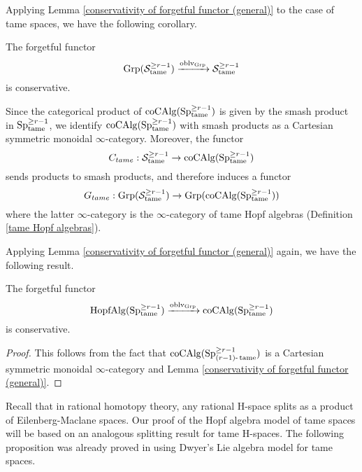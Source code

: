 Applying Lemma \ref{conservativity of forgetful functor (general)} to the case of tame spaces, we have the following corollary.

\begin{corollary}
\label{conservativity of forgetful functor}
	The forgetful functor 
	\[
	\operatorname{Grp}({\mathcal{S}}^{\geq r-1}_{\operatorname{\operatorname{tame}}}) \xrightarrow{\operatorname{oblv}_{\operatorname{Grp}}} 
	{\mathcal{S}}^{\geq r-1}_{\operatorname{\operatorname{tame}}}
	\]
	is conservative.
\end{corollary}

Since the categorical product of $\operatorname{coCAlg}(\operatorname{Sp}^{\geq r-1}_{\operatorname{\operatorname{tame}}})$ is given by the smash product in $\operatorname{Sp}^{\geq r-1}_{\operatorname{\operatorname{tame}}}$, we identify $\operatorname{coCAlg}(\operatorname{Sp}^{\geq r-1}_{\operatorname{\operatorname{tame}}})$ with smash products as a Cartesian symmetric monoidal $\infty$-category. Moreover, the functor 
$$C_{tame}: {\mathcal{S}}^{\geq r-1}_{\operatorname{\operatorname{tame}}} \to
\operatorname{coCAlg}(\operatorname{Sp}^{\geq r-1}_{\operatorname{\operatorname{tame}}})$$
sends products to smash products, and therefore induces a functor
\begin{equation}
\label{G_tame}
    G_{tame}:\operatorname{Grp}({\mathcal{S}}^{\geq r-1}_{\operatorname{\operatorname{tame}}})
\to
\operatorname{Grp}(\operatorname{coCAlg}(\operatorname{Sp}^{\geq r-1}_{\operatorname{\operatorname{tame}}}))
\end{equation}
where the latter $\infty$-category is the $\infty$-category of tame Hopf algebras (Definition \ref{tame Hopf algebras}).

Applying Lemma \ref{conservativity of forgetful functor (general)} again, we have the following result.
\begin{corollary}
\label{conservativity of the forgetful functor for Hopf algebras}
		The forgetful functor 
	\[
	\operatorname{HopfAlg}(\operatorname{Sp}^{\geq r-1}_{\operatorname{\operatorname{tame}}}) \xrightarrow{\operatorname{oblv}_{\operatorname{Grp}}} 
	\operatorname{coCAlg}(\operatorname{Sp}^{\geq r-1}_{\operatorname{\operatorname{tame}}})
	\]
	is conservative.
\end{corollary}
\begin{proof}
	This follows from the fact that $\operatorname{coCAlg}(\operatorname{Sp}^{\geq r-1}_{(r-1)\text{-}\operatorname{\operatorname{tame}}})$ is a Cartesian symmetric monoidal $\infty$-category and Lemma \ref{conservativity of forgetful functor (general)}.
\end{proof}

Recall that in rational homotopy theory, any rational H-space splits as a product of Eilenberg-Maclane spaces.
Our proof of the Hopf algebra model of tame spaces will be based on an analogous splitting result for tame H-spaces. 
The following proposition was already proved in \cite[Proposition 1.7]{Scheerer-Tanre} using Dwyer's Lie algebra model for tame spaces. 


